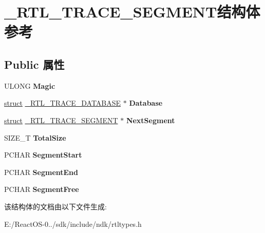 \hypertarget{struct___r_t_l___t_r_a_c_e___s_e_g_m_e_n_t}{}\section{\+\_\+\+R\+T\+L\+\_\+\+T\+R\+A\+C\+E\+\_\+\+S\+E\+G\+M\+E\+N\+T结构体 参考}
\label{struct___r_t_l___t_r_a_c_e___s_e_g_m_e_n_t}
\subsection*{Public 属性}
\begin{DoxyCompactItemize}
\item 
\mbox{\label{struct___r_t_l___t_r_a_c_e___s_e_g_m_e_n_t_a3f03649ea0495e634eb2d9eb61af8909}} 
U\+L\+O\+NG {\bfseries Magic}
\item 
\mbox{\label{struct___r_t_l___t_r_a_c_e___s_e_g_m_e_n_t_a5bd6a15d86fd4d150c4b4c1e6e81fc7c}} 
\hyperlink{interfacestruct}{struct} \hyperlink{struct___r_t_l___t_r_a_c_e___d_a_t_a_b_a_s_e}{\+\_\+\+R\+T\+L\+\_\+\+T\+R\+A\+C\+E\+\_\+\+D\+A\+T\+A\+B\+A\+SE} $\ast$ {\bfseries Database}
\item 
\mbox{\label{struct___r_t_l___t_r_a_c_e___s_e_g_m_e_n_t_ae96a36a97a5cab6fff24441d6c5075cc}} 
\hyperlink{interfacestruct}{struct} \hyperlink{struct___r_t_l___t_r_a_c_e___s_e_g_m_e_n_t}{\+\_\+\+R\+T\+L\+\_\+\+T\+R\+A\+C\+E\+\_\+\+S\+E\+G\+M\+E\+NT} $\ast$ {\bfseries Next\+Segment}
\item 
\mbox{\label{struct___r_t_l___t_r_a_c_e___s_e_g_m_e_n_t_ae73c31eb5e17f22c9fd9bdc6120c0518}} 
S\+I\+Z\+E\+\_\+T {\bfseries Total\+Size}
\item 
\mbox{\label{struct___r_t_l___t_r_a_c_e___s_e_g_m_e_n_t_a69bab51835286358319db3dfaea166f4}} 
P\+C\+H\+AR {\bfseries Segment\+Start}
\item 
\mbox{\label{struct___r_t_l___t_r_a_c_e___s_e_g_m_e_n_t_a12fbe87288489851081596450f6ca7c7}} 
P\+C\+H\+AR {\bfseries Segment\+End}
\item 
\mbox{\label{struct___r_t_l___t_r_a_c_e___s_e_g_m_e_n_t_a9aab87097bbcbf11e16d090499a84765}} 
P\+C\+H\+AR {\bfseries Segment\+Free}
\end{DoxyCompactItemize}


该结构体的文档由以下文件生成\+:\begin{DoxyCompactItemize}
\item 
E\+:/\+React\+O\+S-\/0../sdk/include/ndk/rtltypes.\+h\end{DoxyCompactItemize}
